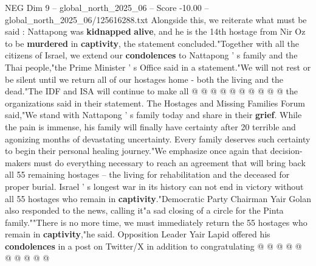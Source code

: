 \begin{textsample}{NEG Dim 9 – global\_north\_2025\_06 – Score -10.00 – global\_north\_2025\_06/125616288.txt}
Alongside this, we reiterate what must be said : Nattapong was \textbf{kidnapped} \textbf{alive}, and he is the 14th hostage from Nir Oz to be \textbf{murdered} in \textbf{captivity}, the statement concluded."Together with all the citizens of Israel, we extend our \textbf{condolences} to Nattapong ' s family and the Thai people,"the Prime Minister ' s Office said in a statement."We will not rest or be silent until we return all of our hostages home - both the living and the dead."The IDF and ISA will continue to make all @ @ @ @ @ @ @ @ @ @ the organizations said in their statement.
The Hostages and Missing Families Forum said,"We stand with Nattapong ' s family today and share in their \textbf{grief}.
While the pain is immense, his family will finally have certainty after 20 terrible and agonizing months of devastating uncertainty.
Every family deserves such certainty to begin their personal healing journey."We emphasize once again that decision-makers must do everything necessary to reach an agreement that will bring back all 55 remaining hostages -- the living for rehabilitation and the deceased for proper burial.
Israel ' s longest war in its history can not end in victory without all 55 hostages who remain in \textbf{captivity}."Democratic Party Chairman Yair Golan also responded to the news, calling it"a sad closing of a circle for the Pinta family.""There is no more time, we must immediately return the 55 hostages who remain in \textbf{captivity},"he said.
Opposition Leader Yair Lapid offered his \textbf{condolences} in a post on Twitter/X in addition to congratulating @ @ @ @ @ @ @ @ @ @

\end{textsample}
